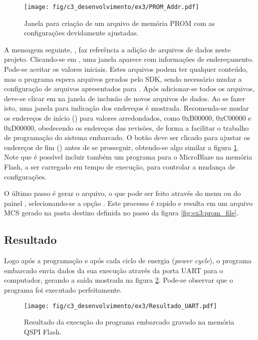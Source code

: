 \documentclass[11pt,a4paper,oneside]{book}
\begin{document}
\begin{figure}[htp]
\centering
\texttt{[image: fig/c3\_desenvolvimento/ex3/PROM\_Addr.pdf]}
\caption{Janela para criação de um arquivo de memória PROM com as configurações devidamente ajustadas.}
\label{fig:ex3:prom_addr}
\end{figure}

A mensagem seguinte, , faz referência a adição de arquivos de dados neste projeto.
Clicando-se em , uma janela aparece com informações de endereçamento.
Pode-se aceitar os valores iniciais.
Estes arquivos podem ter qualquer conteúdo, mas o programa espera arquivos gerados pelo SDK, sendo necessário mudar a configuração de arquivos apresentados para .
Após adicionar-se todos os arquivos, deve-se clicar em  na janela de inclusão de novos arquivos de dados.
Ao se fazer isto, uma janela para indicação dos endereços é mostrada.
Recomenda-se mudar os endereços de início () para valores arredondados, como 0xB00000, 0xC00000 e 0xD00000, obedecendo os endereços das revisões, de forma a facilitar o trabalho de programação do sistema embarcado.
O botão  deve ser clicado para ajustar os endereços de fim () antes de se prosseguir, obtendo-se algo similar a figura \ref{fig:ex3:prom_addr}.
Note que é possível incluir também um programa para o MicroBlaze na memória Flash, a ser carregado em tempo de execução, para controlar a mudança de configurações.

O último passo é gerar o arquivo, o que pode ser feito através do menu  ou do painel , selecionando-se a opção .
Este processo é rapido e resulta em um arquivo MCS gerado na pasta destino definida no passo da figura \ref{fig:ex3:prom_file}.

\subsection{Resultado}
Logo após a programação e após cada ciclo de energia (\textit{power cycle}), o programa embarcado envia dados da sua execução através da porta UART para o computador, gerando a saída mostrada na figura \ref{fig:ex3:resultado}.
Pode-se observar que o programa foi executado perfeitamente.

\begin{figure}[htp]
\centering
\texttt{[image: fig/c3\_desenvolvimento/ex3/Resultado\_UART.pdf]}
\caption{Resultado da execução do programa embarcado gravado na memória QSPI Flash.}
\label{fig:ex3:resultado}
\end{figure}
\end{document}
